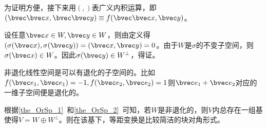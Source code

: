 为证明方便，接下来用$(,)$表广义内积运算，即$(\bvec \bvec x,\bvec \bvec y)\equiv f(\bvec \bvec x,\bvec y) $。

设任意$\bvec x\in W,\bvec y\in W$，则由定义得$(\sigma (\bvec x),\sigma(\bvec y))=(\bvec x,\bvec y)=0$。由于$W$是$\sigma$的不变子空间，则$\sigma (\bvec x)\in W$。因此$\sigma(\bvec y)\in W^{\bot}$，得证。


非退化线性空间是可以有退化的子空间的。比如$f(\bvec e_1,\bvec e_1)=-1,f(\bvec e_2,\bvec e_2)=1$则$\bvec e_1+\bvec e_2$对应的一维子空间便是退化的。

根据\autoref{the_OrSp_1}~和\autoref{the_OrSp_2}~可知，若$W$是非退化的，则$V$内总存在一组基使得$V=W\oplus W^{\bot}$。则在该基下，等距变换是比较简洁的块对角形式。